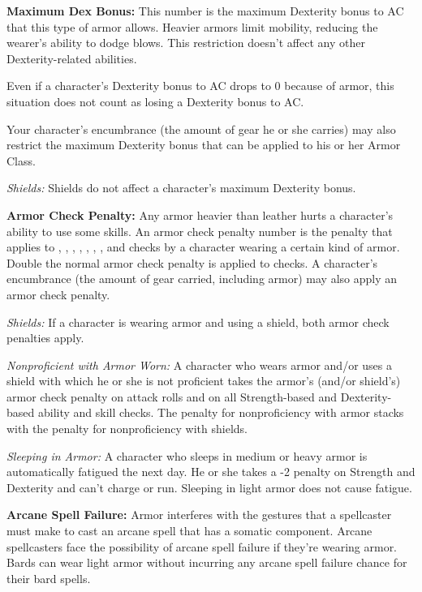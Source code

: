 \textbf{Maximum Dex Bonus:} This number is the maximum Dexterity bonus to AC that 
this type of armor allows. Heavier armors limit mobility, reducing the wearer's 
ability to dodge blows. This restriction doesn't affect any other Dexterity-related 
abilities.

Even if a character's Dexterity bonus to AC drops to 0 because of armor, this situation 
does not count as losing a Dexterity bonus to AC. 

Your character's encumbrance (the amount of gear he or she carries) may also restrict 
the maximum Dexterity bonus that can be applied to his or her Armor Class.

\textit{Shields:} Shields do not affect a character's maximum Dexterity bonus.

\textbf{Armor Check Penalty:} Any armor heavier than leather hurts a character's 
ability to use some skills. An armor check penalty number is the penalty that applies 
to , , , , , , , and 
 checks by a character wearing a certain kind of armor. Double the normal 
armor check penalty is applied to  checks. A character's encumbrance (the amount 
of gear carried, including armor) may also apply an armor check penalty.

\textit{Shields:} If a character is wearing armor and using a shield, both armor 
check penalties apply.

\textit{Nonproficient with Armor Worn:} A character who wears armor and/or uses 
a shield with which he or she is not proficient takes the armor's (and/or shield's) 
armor check penalty on attack rolls and on all Strength-based and Dexterity-based 
ability and skill checks. The penalty for nonproficiency with armor stacks with 
the penalty for nonproficiency with shields.

\textit{Sleeping in Armor:} A character who sleeps in medium or heavy armor is 
automatically fatigued the next day. He or she takes a -2 penalty on Strength and 
Dexterity and can't charge or run. Sleeping in light armor does not cause fatigue.

\textbf{Arcane Spell Failure:} Armor interferes with the gestures that a spellcaster 
must make to cast an arcane spell that has a somatic component. Arcane spellcasters 
face the possibility of arcane spell failure if they're wearing armor. Bards can 
wear light armor without incurring any arcane spell failure chance for their bard 
spells.

